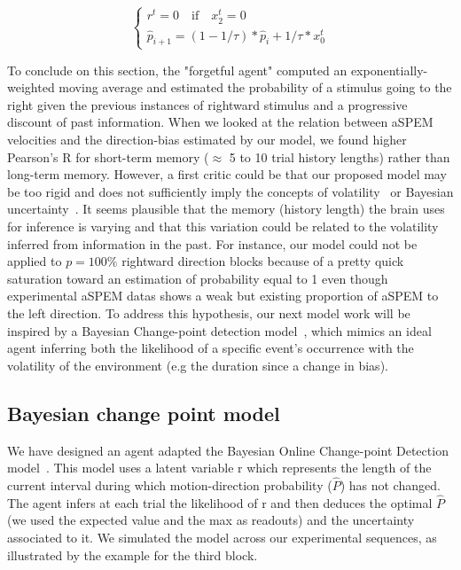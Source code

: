 \documentclass[profile,final,english, draft]{article}%
\newcommand{\choice}[1]{ %
	\left\{ %
		\begin{array}{l} #1 \end{array} %
	\right. }
\newcommand{\eql}[1]{\begin{equation}#1\end{equation}}
\newcommand{\citep}[1]{\parencite{#1}}
\begin{document}
\eql{\choice{
r^t = 0 \quad \text{if} \quad x_2^t=0 \\
\hat{p}_{i+1} = (1 - 1/\tau)*\hat{p}_{i} + 1/\tau * x_0^t}
\label{eq:leaky}}


To conclude on this section, the "forgetful agent" computed an exponentially-weighted moving average and estimated the probability of a stimulus going to the right given the previous instances of rightward stimulus and a progressive discount of past information. When we looked at the relation between aSPEM velocities and the direction-bias estimated by our model, we found higher Pearson's R for short-term memory ($\approx$ 5 to 10 trial history lengths) rather than long-term memory. However, a first critic could be that our proposed model may be too rigid and does not sufficiently imply the concepts of volatility~\citep{Behrens2007} or Bayesian uncertainty~\citep{Vilares2011}. It seems plausible that the memory (history length) the brain uses for inference is varying and that this variation could be related to the volatility inferred from information in the past. For instance, our model could not be applied to $p = 100\%$ rightward direction blocks because of a pretty quick saturation toward an estimation of probability equal to 1 even though experimental aSPEM datas shows a weak but existing proportion of aSPEM to the left direction. To address this hypothesis, our next model work will be inspired by a Bayesian Change-point detection model~\citep{Adams2007}, which mimics an ideal agent inferring both the likelihood of a specific event's occurrence with the volatility of the environment (e.g the duration since a change in bias).




\subsection{Bayesian change point model}
We have designed an agent adapted the Bayesian Online Change-point Detection model~\citep{AdamsMackay2007}. This model uses a latent variable r which represents the length of the current interval during which motion-direction probability ($\hat{P}$) has not changed. The agent infers at each trial the likelihood  of r and then deduces the optimal $\hat{P}$ (we used the expected value and the max as readouts) and the uncertainty associated to it. We simulated the model across our experimental sequences, as illustrated by the example for the third block.
\end{document}
